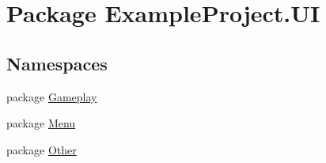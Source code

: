 \hypertarget{namespace_example_project_1_1_u_i}{}\section{Package Example\+Project.\+U\+I}
\label{namespace_example_project_1_1_u_i}
\subsection*{Namespaces}
\begin{DoxyCompactItemize}
\item 
package \hyperlink{namespace_example_project_1_1_u_i_1_1_gameplay}{Gameplay}
\item 
package \hyperlink{namespace_example_project_1_1_u_i_1_1_menu}{Menu}
\item 
package \hyperlink{namespace_example_project_1_1_u_i_1_1_other}{Other}
\end{DoxyCompactItemize}
